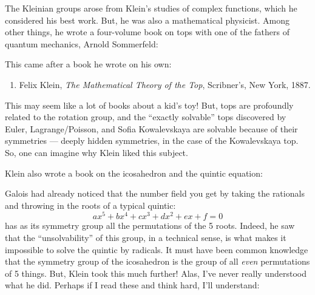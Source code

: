 \documentclass{article}
\def\tightlist{}
\renewcommand{\texttt}[1]{%
  \begingroup
  \ttfamily
  \begingroup\lccode`~=`/\lowercase{\endgroup\def~}{/\discretionary{}{}{}}%
  \begingroup\lccode`~=`[\lowercase{\endgroup\def~}{[\discretionary{}{}{}}%
  \begingroup\lccode`~=`.\lowercase{\endgroup\def~}{.\discretionary{}{}{}}%
  \catcode`/=\active\catcode`[=\active\catcode`.=\active
  \scantokens{#1\noexpand}%
  \endgroup
}
\begin{document}
The Kleinian groups arose from Klein's studies of complex functions,
which he considered his best work. But, he was also a mathematical
physicist. Among other things, he wrote a four-volume book on tops with
one of the fathers of quantum mechanics, Arnold Sommerfeld:


This came after a book he wrote on his own:

\begin{enumerate}
\def\labelenumi{\arabic{enumi})}
\setcounter{enumi}{4}
\tightlist
\item
  Felix Klein, \emph{The Mathematical Theory of the Top}, Scribner's,
  New York, 1887.
\end{enumerate}

This may seem like a lot of books about a kid's toy! But, tops are
profoundly related to the rotation group, and the ``exactly solvable''
tops discovered by Euler, Lagrange/Poisson, and Sofia Kowalevskaya are
solvable because of their symmetries --- deeply hidden symmetries, in
the case of the Kowalevskaya top. So, one can imagine why Klein liked
this subject.

Klein also wrote a book on the icosahedron and the quintic equation:


Galois had already noticed that the number field you get by taking the
rationals and throwing in the roots of a typical quintic:
\[ax^5 + bx^4 + cx^3 + dx^2 + ex + f = 0\] has as its symmetry group all
the permutations of the 5 roots. Indeed, he saw that the
``unsolvability'' of this group, in a technical sense, is what makes it
impossible to solve the quintic by radicals. It must have been common
knowledge that the symmetry group of the icosahedron is the group of all
\emph{even} permutations of 5 things. But, Klein took this much further!
Alas, I've never really understood what he did. Perhaps if I read these
and think hard, I'll understand:
\end{document}
